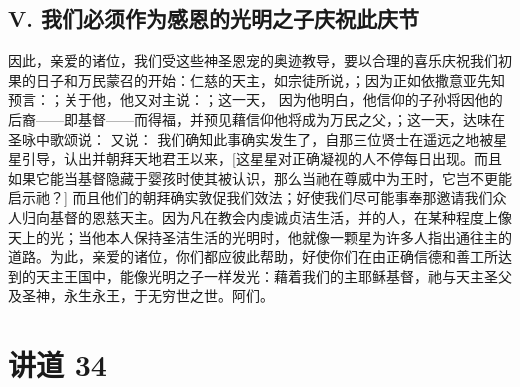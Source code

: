 
\subsection{V. 我们必须作为感恩的光明之子庆祝此庆节}

因此，亲爱的诸位，我们受这些神圣恩宠的奥迹教导，要以合理的喜乐庆祝我们初果的日子和万民蒙召的开始：仁慈的天主，如宗徒所说，；因为正如依撒意亚先知预言：；关于他，他又对主说：；这一天， 因为他明白，他信仰的子孙将因他的后裔——即基督——而得福，并预见藉信仰他将成为万民之父，；这一天，达味在圣咏中歌颂说： 又说： 我们确知此事确实发生了，自那三位贤士在遥远之地被星星引导，认出并朝拜天地君王以来，[这星星对正确凝视的人不停每日出现。而且如果它能当基督隐藏于婴孩时使其被认识，那么当祂在尊威中为王时，它岂不更能启示祂？] 而且他们的朝拜确实敦促我们效法；好使我们尽可能事奉那邀请我们众人归向基督的恩慈天主。因为凡在教会内虔诚贞洁生活，并的人，在某种程度上像天上的光；当他本人保持圣洁生活的光明时，他就像一颗星为许多人指出通往主的道路。为此，亲爱的诸位，你们都应彼此帮助，好使你们在由正确信德和善工所达到的天主王国中，能像光明之子一样发光：藉着我们的主耶稣基督，祂与天主圣父及圣神，永生永王，于无穷世之世。阿们。\par



\section{讲道 34}

\par

